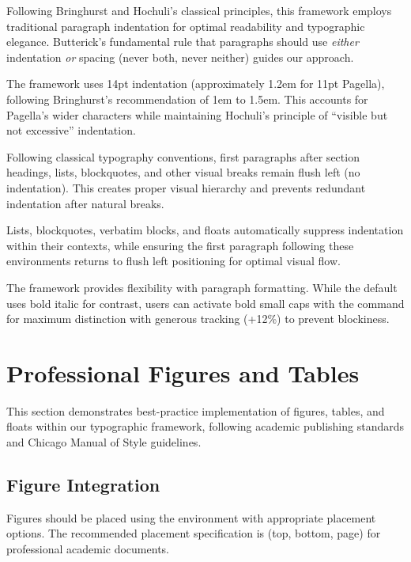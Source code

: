 \documentclass[11pt]{article}
\begin{document}
Following Bringhurst and Hochuli's classical principles, this framework employs traditional paragraph indentation for optimal readability and typographic elegance. Butterick's fundamental rule that paragraphs should use \emph{either} indentation \emph{or} spacing (never both, never neither) guides our approach.

 The framework uses 14pt indentation (approximately 1.2em for 11pt Pagella), following Bringhurst's recommendation of 1em to 1.5em. This accounts for Pagella's wider characters while maintaining Hochuli's principle of ``visible but not excessive'' indentation.

 Following classical typography conventions, first paragraphs after section headings, lists, blockquotes, and other visual breaks remain flush left (no indentation). This creates proper visual hierarchy and prevents redundant indentation after natural breaks.

 Lists, blockquotes, verbatim blocks, and floats automatically suppress indentation within their contexts, while ensuring the first paragraph following these environments returns to flush left positioning for optimal visual flow.

 The framework provides flexibility with paragraph formatting. While the default uses bold italic for contrast, users can activate bold small caps with the  command for maximum distinction with generous tracking (+12\%) to prevent blockiness.

\section{Professional Figures and Tables}

This section demonstrates best-practice implementation of figures, tables, and floats within our typographic framework, following academic publishing standards and Chicago Manual of Style guidelines.

\subsection{Figure Integration}

Figures should be placed using the  environment with appropriate placement options. The recommended placement specification is \code{[tbp]} (top, bottom, page) for professional academic documents.
\end{document}
